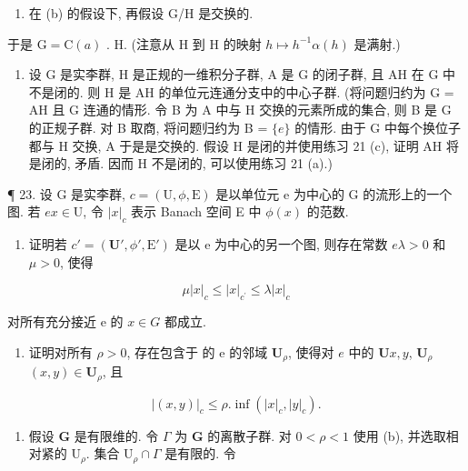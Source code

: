 \begin{enumerate}
\def\labelenumi{(\alph{enumi})}
\setcounter{enumi}{2}
\tightlist
\item
  在 (b) 的假设下, 再假设 G/H 是交换的.
\end{enumerate}

于是 \(\mathrm{G} = \mathrm{C}(a)\) . H. (注意从 H 到 H 的映射 \(h \mapsto h^{-1}\alpha(h)\) 是满射.)

\begin{enumerate}
\def\labelenumi{\arabic{enumi}.}
\setcounter{enumi}{21}
\tightlist
\item
  设 G 是实李群, H 是正规的一维积分子群, A 是 G 的闭子群, 且 AH 在 G 中不是闭的. 则 H 是 AH 的单位元连通分支中的中心子群. (将问题归约为 G = AH 且 G 连通的情形. 令 B 为 A 中与 H 交换的元素所成的集合, 则 B 是 G 的正规子群. 对 B 取商, 将问题归约为 B = \(\{e\}\) 的情形. 由于 G 中每个换位子都与 H 交换, A 于是是交换的. 假设 H 是闭的并使用练习 21 (c), 证明 AH 将是闭的, 矛盾. 因而 H 不是闭的, 可以使用练习 21 (a).)
\end{enumerate}

¶ 23. 设 G 是实李群, \(c = (\mathrm{U}, \phi, \mathrm{E})\) 是以单位元 e 为中心的 G 的流形上的一个图. 若 \(e\)\(x \in \mathrm{U}\), 令 \(|x|_c\) 表示 Banach 空间 E 中 \(\phi(x)\) 的范数.

\begin{enumerate}
\def\labelenumi{(\alph{enumi})}
\tightlist
\item
  证明若 \(c' = (\mathbf{U}', \phi', \mathrm{E}')\) 是以 e 为中心的另一个图, 则存在常数 \(e\)\(\lambda > 0\) 和 \(\mu > 0\), 使得
\end{enumerate}

\[
\mu | x | _ {c} \leqslant | x | _ {c ^ {\prime}} \leqslant \lambda | x | _ {c}
\]

对所有充分接近 e 的 \(x \in G\) 都成立.

\begin{enumerate}
\def\labelenumi{(\alph{enumi})}
\setcounter{enumi}{1}
\tightlist
\item
  证明对所有 \(\rho > 0\), 存在包含于  的 e 的邻域 \(\mathbf{U}_{\rho}\), 使得对 \(e\) 中的 \(\mathbf{U}\)\(x, y\), \(\mathbf{U}_{\rho}\)\((x, y) \in \mathbf{U}_{\rho}\), 且
\end{enumerate}

\[
\left| (x, y) \right| _ {c} \leqslant \rho . \inf (\left| x \right| _ {c}, \left| y \right| _ {c}).
\]

\begin{enumerate}
\def\labelenumi{(\alph{enumi})}
\setcounter{enumi}{2}
\tightlist
\item
  假设 \(\mathbf{G}\) 是有限维的. 令 \(\Gamma\) 为 \(\mathbf{G}\) 的离散子群. 对 \(0 < \rho < 1\) 使用 (b), 并选取相对紧的 \(\mathrm{U}_{\rho}\). 集合 \(\mathrm{U}_{\rho} \cap \Gamma\) 是有限的. 令
\end{enumerate}

